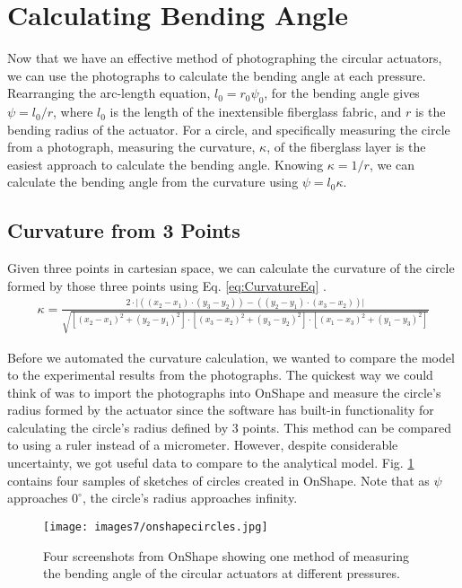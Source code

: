 \section{Calculating Bending Angle}

Now that we have an effective method of photographing the circular actuators, we can use the photographs to calculate the bending angle at each pressure. Rearranging the arc-length equation, $l_{0} = r_{0}\psi_{0}$, for the bending angle gives $\psi = l_0/r$, where $l_0$ is the length of the inextensible fiberglass fabric, and $r$ is the bending radius of the actuator. For a circle, and specifically measuring the circle from a photograph, measuring the curvature, $\kappa$, of the fiberglass layer is the easiest approach to calculate the bending angle. Knowing $\kappa = 1/r$, we can calculate the bending angle from the curvature using $\psi = l_{0}\kappa$. 

\subsection{Curvature from 3 Points}

Given three points in cartesian space, we can calculate the curvature of the circle formed by those three points using Eq. \ref{eq:CurvatureEq} \cite{ratliff_cartesian_2019}. 
\begin{align} 
    \kappa = \frac{2\cdot\lvert((x_2-x_1)\cdot(y_3-y_2)) - ((y_2-y_1)\cdot(x_3-x_2))\rvert}{\sqrt{[(x_2-x_1)^2+(y_2-y_1)^2] \cdot [(x_3-x_2)^2+(y_3-y_2)^2] \cdot [(x_1-x_3)^2+(y_1-y_3)^2]}} 
    \label{eq:CurvatureEq} 
\end{align}

Before we automated the curvature calculation, we wanted to compare the model to the experimental results from the photographs. The quickest way we could think of was to import the photographs into OnShape and measure the circle's radius formed by the actuator since the software has built-in functionality for calculating the circle's radius defined by 3 points. This method can be compared to using a ruler instead of a micrometer. However, despite considerable uncertainty, we got useful data to compare to the analytical model. Fig. \ref{fig:onshapecircles} contains four samples of sketches of circles created in OnShape. Note that as $\psi$ approaches $0^\circ$, the circle's radius approaches infinity. 

\begin{figure}[h]
    \centering
     \texttt{[image: images7/onshapecircles.jpg]}
    \caption{Four screenshots from OnShape showing one method of measuring the bending angle of the circular actuators at different pressures.}
    \label{fig:onshapecircles}
\end{figure}

